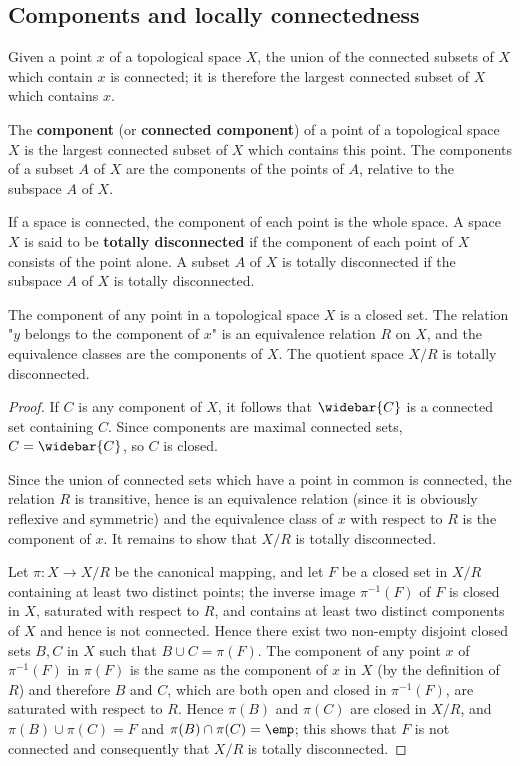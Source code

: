 \subsection{Components and locally connectedness}
Given a point $x$ of a topological space $X$, the union of the connected subsets of $X$ which contain $x$ is connected; it is therefore the largest connected subset of $X$ which contains $x$.
\begin{definition}
The \textbf{component} (or \textbf{connected component}) of a point of a topological space $X$ is the largest connected subset of $X$ which contains this point. The components of a subset $A$ of $X$ are the components of the points of $A$, relative to the subspace $A$ of $X$.
\end{definition}
If a space is connected, the component of each point is the whole space. A space $X$ is said to be \textbf{totally disconnected} if the component of each point of $X$ consists of the point alone. A subset $A$ of $X$ is totally disconnected if the subspace $A$ of $X$ is totally disconnected.
\begin{proposition}\label{topo space component is closed}
The component of any point in a topological space $X$ is a closed set. The relation "$y$ belongs to the component of $x$" is an equivalence relation $R$ on $X$, and the equivalence classes are the components of $X$. The quotient space $X/R$ is totally disconnected.
\end{proposition}
\begin{proof}
If $C$ is any component of $X$, it follows that $\widebar{C}$ is a connected set containing $C$. Since components are maximal connected sets, $C=\widebar{C}$, so $C$ is closed.\par
Since the union of connected sets which have a point in common is connected, the relation $R$ is transitive, hence is an equivalence relation (since it is obviously reflexive and symmetric) and the equivalence class of $x$ with respect to $R$ is the component of $x$. It remains to show that $X/R$ is totally disconnected.\par
Let $\pi:X\to X/R$ be the canonical mapping, and let $F$ be a closed set in $X/R$ containing at least two distinct points; the inverse image $\pi^{-1}(F)$ of $F$ is closed in $X$, saturated with respect to $R$, and contains at least two distinct components of $X$ and hence is not connected. Hence there exist two non-empty disjoint closed sets $B,C$ in $X$ such that $B\cup C=\pi(F)$. The component of any point $x$ of $\pi^{-1}(F)$ in $\pi(F)$ is the same as the component of $x$ in $X$ (by the definition of $R$) and therefore $B$ and $C$, which are both open and closed in $\pi^{-1}(F)$, are saturated with respect to $R$. Hence $\pi(B)$ and $\pi(C)$ are closed in $X/R$, and $\pi(B)\cup\pi(C)=F$ and $\pi(B)\cap\pi(C)=\emp$; this shows that $F$ is not connected and consequently that $X/R$ is totally disconnected.
\end{proof}
